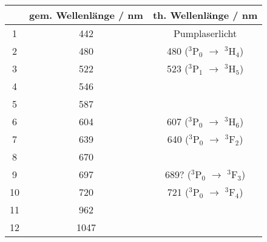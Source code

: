 \begin{center}
\begin{tabular}{|c|c|c|}
\hline
  & gem. Wellenlänge / nm & th. Wellenlänge / nm \cite{Versuchsanleitung} \\ \hline
1 & 442 & Pumplaserlicht \\ \hline
2 & 480 & 480 ($^3$P$_0$ $\rightarrow$ $^3$H$_4$) \\ \hline
3 & 522 & 523 ($^3$P$_1$ $\rightarrow$ $^3$H$_5$) \\ \hline
4 & 546 &  \\ \hline
5 & 587 &  \\ \hline
6 & 604 & 607 ($^3$P$_0$ $\rightarrow$ $^3$H$_6$) \\ \hline
7 & 639 & 640 ($^3$P$_0$ $\rightarrow$ $^3$F$_2$) \\ \hline
8 & 670 &  \\ \hline
9 & 697 & 689? ($^3$P$_0$ $\rightarrow$ $^3$F$_3$) \\ \hline
10 & 720 & 721 ($^3$P$_0$ $\rightarrow$ $^3$F$_4$) \\ \hline
11 & 962 &  \\ \hline
12 & 1047 &  \\ \hline
\end{tabular}
\end{center}